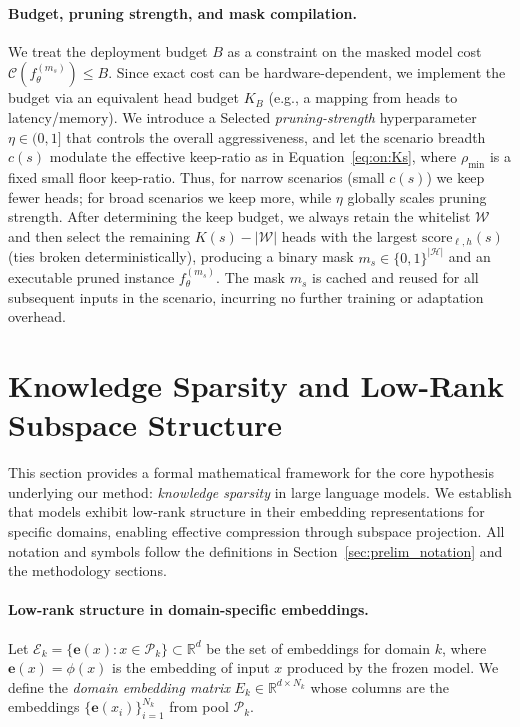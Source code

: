 \paragraph{Budget, pruning strength, and mask compilation.}
\label{app:budget_mapping}
We treat the deployment budget $B$ as a constraint on the masked model cost $\mathcal{C}(f_{\theta}^{(m_s)}) \leq B$.
Since exact cost can be hardware-dependent, we implement the budget via an equivalent head budget $K_B$ (e.g., a mapping from heads to latency/memory).
We introduce a Selected \emph{pruning-strength} hyperparameter $\eta \in (0,1]$ that controls the overall aggressiveness, and let the scenario breadth $c(s)$ modulate the effective keep-ratio as in Equation~\eqref{eq:on:Ks}, where $\rho_{\min}$ is a fixed small floor keep-ratio.
Thus, for narrow scenarios (small $c(s)$) we keep fewer heads; for broad scenarios we keep more, while $\eta$ globally scales pruning strength.
After determining the keep budget, we always retain the whitelist $\mathcal{W}$ and then select the remaining $K(s) - |\mathcal{W}|$ heads with the largest $\mathrm{score}_{\ell,h}(s)$ (ties broken deterministically), producing a binary mask $m_s \in \{0,1\}^{|\mathcal{H}|}$ and an executable pruned instance $f_{\theta}^{(m_s)}$.
The mask $m_s$ is cached and reused for all subsequent inputs in the scenario, incurring no further training or adaptation overhead.


\clearpage
{}

\section{Knowledge Sparsity and Low-Rank Subspace Structure}
\label{app:math_foundations}

This section provides a formal mathematical framework for the core hypothesis underlying our method: \emph{knowledge sparsity} in large language models.
We establish that models exhibit low-rank structure in their embedding representations for specific domains, enabling effective compression through subspace projection.
All notation and symbols follow the definitions in Section~\ref{sec:prelim_notation} and the methodology sections.

\paragraph{Low-rank structure in domain-specific embeddings.}
Let $\mathcal{E}_k = \{\mathbf{e}(x): x \in \mathcal{P}_k\} \subset \mathbb{R}^d$ be the set of embeddings for domain $k$, where $\mathbf{e}(x) = \phi(x)$ is the embedding of input $x$ produced by the frozen model.
We define the \emph{domain embedding matrix} $E_k \in \mathbb{R}^{d \times N_k}$ whose columns are the embeddings $\{\mathbf{e}(x_i)\}_{i=1}^{N_k}$ from pool $\mathcal{P}_k$.

